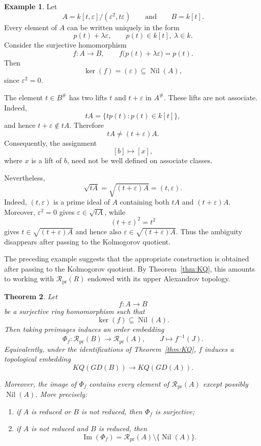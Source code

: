 \documentclass[11pt]{amsart}
\theoremstyle{plain}
\newtheorem{theorem}{Theorem}[section]
\theoremstyle{definition}
\newtheorem{example}[theorem]{Example}
\theoremstyle{remark}
\numberwithin{equation}{section}
\begin{document}
\begin{example}\label{ex:lifts-not-associate}
	Let
	\[
	A=k[t,\varepsilon]/(\varepsilon^2,t\varepsilon)
	\qquad\text{and}\qquad
	B=k[t].
	\]
	Every element of $A$ can be written uniquely in the form
	\[
	p(t)+\lambda\varepsilon,
	\qquad p(t)\in k[t],\ \lambda\in k.
	\]
	Consider the surjective homomorphism
	\[
	f:A\longrightarrow B,
	\qquad
	f\bigl(p(t)+\lambda\varepsilon\bigr)=p(t).
	\]
	Then
	\[
	\ker(f)=(\varepsilon)\subseteq\operatorname{Nil}(A),
	\]
	since $\varepsilon^2=0$.
	
	The element $t\in B^\#$ has two lifts $t$ and
	$t+\varepsilon$ in $A^\#$. These lifts are not associate. Indeed,
	\[
	tA=\{tp(t):p(t)\in k[t]\},
	\]
	and hence $t+\varepsilon\notin tA$. Therefore
	\[
	tA\neq(t+\varepsilon)A.
	\]
	Consequently, the assignment
	\[
	[b]\longmapsto[x],
	\]
	where $x$ is a lift of $b$, need not be well defined on associate
	classes.
	
	Nevertheless,
	\[
	\sqrt{tA}
	=
	\sqrt{(t+\varepsilon)A}
	=
	(t,\varepsilon).
	\]
	Indeed, $(t,\varepsilon)$ is a prime ideal of $A$ containing both
	$tA$ and $(t+\varepsilon)A$. Moreover, $\varepsilon^2=0$ gives
	$\varepsilon\in\sqrt{tA}$, while
	\[
	(t+\varepsilon)^2=t^2
	\]
	gives $t\in\sqrt{(t+\varepsilon)A}$ and hence also
	$\varepsilon\in\sqrt{(t+\varepsilon)A}$.
	Thus the ambiguity disappears after passing to the Kolmogorov
	quotient.
\end{example}

The preceding example suggests that the appropriate construction is
obtained after passing to the Kolmogorov quotient. By
Theorem~\ref{thm:KQ}, this amounts to working with
$\mathcal R_{\mathrm{pr}}(R)$ endowed with its upper Alexandrov
topology.

\begin{theorem}\label{thm:nilpotent-pullback}
	Let
	\[
	f:A\longrightarrow B
	\]
	be a surjective ring homomorphism such that
	\[
	\ker(f)\subseteq\operatorname{Nil}(A).
	\]
	Then taking preimages induces an order embedding
	\[
	\Phi_f:
	\mathcal R_{\mathrm{pr}}(B)
	\longrightarrow
	\mathcal R_{\mathrm{pr}}(A),
	\qquad
	J\longmapsto f^{-1}(J).
	\]
	Equivalently, under the identifications of
	Theorem~\ref{thm:KQ}, $f$ induces a topological embedding
	\[
	KQ(GD(B))
	\longrightarrow
	KQ(GD(A)).
	\]
	
	Moreover, the image of $\Phi_f$ contains every element of
	$\mathcal R_{\mathrm{pr}}(A)$ except possibly
	$\operatorname{Nil}(A)$. More precisely:
	\begin{enumerate}
		\item if $A$ is reduced or $B$ is not reduced, then $\Phi_f$ is surjective;
		\item if $A$ is not reduced and $B$ is reduced, then
		\[
		\operatorname{Im}(\Phi_f)
		=
		\mathcal R_{\mathrm{pr}}(A)
		\setminus\{\operatorname{Nil}(A)\}.
		\]
	\end{enumerate}
\end{theorem}
\end{document}

